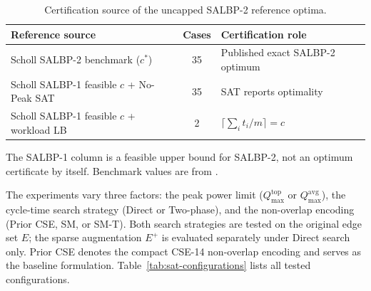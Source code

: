 \documentclass[]{interact}
\theoremstyle{plain}
\theoremstyle{definition}
\theoremstyle{remark}
\begin{document}
\begin{table}[t!]
\centering
\caption{Certification source of the uncapped SALBP-2 reference optima.}
\label{tab:no-peak-reference}
\footnotesize
\renewcommand{\arraystretch}{1.15}
\setlength{\tabcolsep}{5pt}
\begin{threeparttable}
\begin{tabular}{@{} l c l @{}}
\toprule
Reference source & Cases & Certification role \\
\midrule
Scholl SALBP-2 benchmark ($c^*$) & 35 & Published exact SALBP-2 optimum \\
Scholl SALBP-1 feasible $c$ + No-Peak SAT & 35 & SAT reports optimality \\
Scholl SALBP-1 feasible $c$ + workload LB & 2 & $\lceil\sum_i t_i/m\rceil = c$ \\
\bottomrule
\end{tabular}
\begin{tablenotes}[flushleft]
\scriptsize
\item The SALBP-1 column is a feasible upper bound for SALBP-2, not an optimum certificate by itself. Benchmark values are from \citet{SchollBenchmark1993}.
\end{tablenotes}
\end{threeparttable}
\end{table}

The experiments vary three factors: the peak power limit ($Q_{\max}^{\mathrm{top}}$ or $Q_{\max}^{\mathrm{avg}}$), the cycle-time search strategy (Direct or Two-phase), and the non-overlap encoding (Prior CSE, SM, or SM-T). Both search strategies are tested on the original edge set $E$; the sparse augmentation $E^+$ is evaluated separately under Direct search only. Prior CSE denotes the compact CSE-14 non-overlap encoding \citep{VanKieu2025Compact} and serves as the baseline formulation. Table~\ref{tab:sat-configurations} lists all tested configurations.
\end{document}
